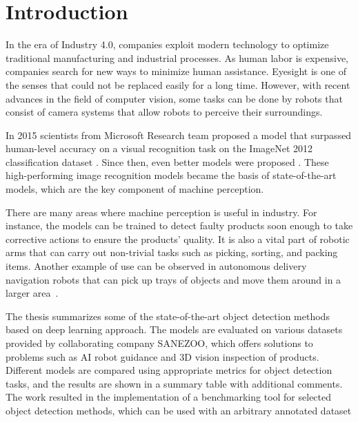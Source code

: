 \chapter{Introduction}

In the era of Industry 4.0, companies exploit modern technology to optimize traditional manufacturing and industrial processes. As human labor is expensive, companies search for new ways to minimize human assistance. Eyesight is one of the senses that could not be replaced easily for a long time. However, with recent advances in the field of computer vision, some tasks can be done by robots that consist of camera systems that allow robots to perceive their surroundings.

In 2015 scientists from Microsoft Research team proposed a  model that surpassed human-level accuracy on a visual recognition task on the ImageNet 2012 classification dataset \cite{surp2015}. Since then, even better models were proposed \cite{resnet, efficientnet}. These high-performing image recognition models became the basis of state-of-the-art  models, which are the key component of machine perception.

There are many areas where machine perception is useful in industry. For instance, the models can be trained to detect faulty products soon enough to take corrective actions to ensure the products' quality. It is also a vital part of robotic arms that can carry out non-trivial tasks such as picking, sorting, and packing items. Another example of use can be observed in autonomous delivery navigation robots that can pick up trays of objects and move them around in a larger area~\cite{bmw}.

The thesis summarizes some of the state-of-the-art object detection methods based on deep learning approach. The models are evaluated on various datasets provided by collaborating company SANEZOO, which offers solutions to problems such as AI robot guidance and 3D vision inspection of products. Different models are compared using appropriate metrics for object detection tasks, and the results are shown in a summary table with additional comments. The work resulted in the implementation of a benchmarking tool for selected object detection methods, which can be used with an arbitrary annotated dataset

